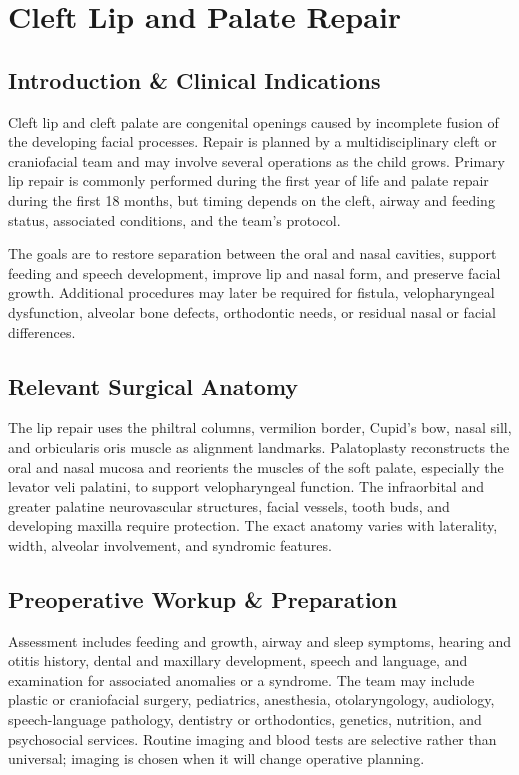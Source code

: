 \chapter{Cleft Lip and Palate Repair}

\section*{Introduction \& Clinical Indications}
Cleft lip and cleft palate are congenital openings caused by incomplete fusion of the developing facial processes. Repair is planned by a multidisciplinary cleft or craniofacial team and may involve several operations as the child grows. Primary lip repair is commonly performed during the first year of life and palate repair during the first 18 months, but timing depends on the cleft, airway and feeding status, associated conditions, and the team's protocol.

The goals are to restore separation between the oral and nasal cavities, support feeding and speech development, improve lip and nasal form, and preserve facial growth. Additional procedures may later be required for fistula, velopharyngeal dysfunction, alveolar bone defects, orthodontic needs, or residual nasal or facial differences.

\section*{Relevant Surgical Anatomy}
The lip repair uses the philtral columns, vermilion border, Cupid's bow, nasal sill, and orbicularis oris muscle as alignment landmarks. Palatoplasty reconstructs the oral and nasal mucosa and reorients the muscles of the soft palate, especially the levator veli palatini, to support velopharyngeal function. The infraorbital and greater palatine neurovascular structures, facial vessels, tooth buds, and developing maxilla require protection. The exact anatomy varies with laterality, width, alveolar involvement, and syndromic features.

\section*{Preoperative Workup \& Preparation}
Assessment includes feeding and growth, airway and sleep symptoms, hearing and otitis history, dental and maxillary development, speech and language, and examination for associated anomalies or a syndrome. The team may include plastic or craniofacial surgery, pediatrics, anesthesia, otolaryngology, audiology, speech-language pathology, dentistry or orthodontics, genetics, nutrition, and psychosocial services. Routine imaging and blood tests are selective rather than universal; imaging is chosen when it will change operative planning.

